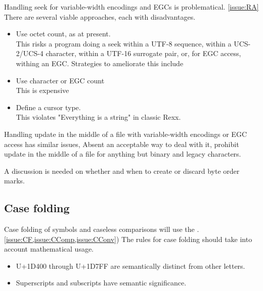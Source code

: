 \documentclass[b4paper]{article}
\begin{document}
Handling seek for variable-width encodings and EGCs is problematical.
\cref{issue:RA}
There are several viable approaches, each with disadvantages.

\begin{itemize}
\item Use octet count, as at present. \\
This risks a program doing a seek within a UTF-8 sequence,
within a UCS-2/UCS-4 character,
within a UTF-16 surrogate pair,
or, for EGC access, withing an EGC.
Strategies to ameliorate this include
\item Use character or EGC count \\
This is expensive
\item Define a cursor type. \\
This violates "Everything is a string" in classic Rexx.
\end{itemize}

Handling update in the middle of a file with variable-width encodings
or EGC access has similar issues, Absent an acceptable way to deal
with it, prohibit update in the middle of a file for anything but
binary and legacy characters.


A discussion is needed on whether and when to create or discard byte order marks.

\subsection{Case folding}

Case folding of symbols and caseless comparisons will use the \cite{UCD}.
\cref{issue:CF,issue:CComp,issue:CConv})
The rules for case folding should take into account mathematical usage.
\begin{itemize}
\item U+1D400 through U+1D7FF are semantically distinct from other letters.
\item Superscripts and subscripts have semantic significance.
\end{itemize}
\end{document}
